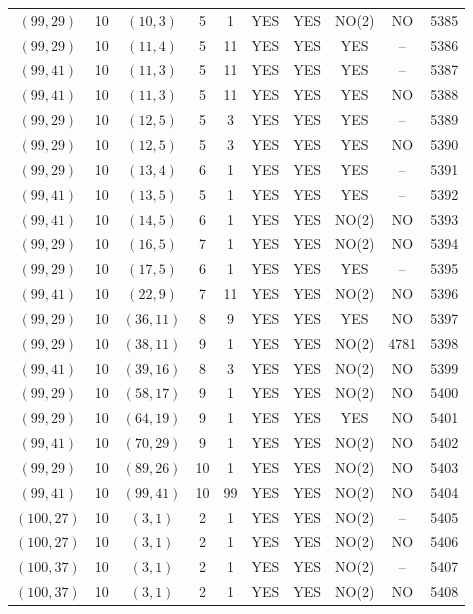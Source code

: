\begin{longtable}{|c|c|c|c|c|c|c|c|c|c|}
$(99, 29)$ & 10 & $(10, 3)$ & 5 & 1 & YES & YES & NO(2) & NO & 5385\\
$(99, 29)$ & 10 & $(11, 4)$ & 5 & 11 & YES & YES & YES & -- & 5386\\
$(99, 41)$ & 10 & $(11, 3)$ & 5 & 11 & YES & YES & YES & -- & 5387\\
$(99, 41)$ & 10 & $(11, 3)$ & 5 & 11 & YES & YES & YES & NO & 5388\\
$(99, 29)$ & 10 & $(12, 5)$ & 5 & 3 & YES & YES & YES & -- & 5389\\
$(99, 29)$ & 10 & $(12, 5)$ & 5 & 3 & YES & YES & YES & NO & 5390\\
$(99, 29)$ & 10 & $(13, 4)$ & 6 & 1 & YES & YES & YES & -- & 5391\\
$(99, 41)$ & 10 & $(13, 5)$ & 5 & 1 & YES & YES & YES & -- & 5392\\
$(99, 41)$ & 10 & $(14, 5)$ & 6 & 1 & YES & YES & NO(2) & NO & 5393\\
$(99, 29)$ & 10 & $(16, 5)$ & 7 & 1 & YES & YES & NO(2) & NO & 5394\\
$(99, 29)$ & 10 & $(17, 5)$ & 6 & 1 & YES & YES & YES & -- & 5395\\
$(99, 41)$ & 10 & $(22, 9)$ & 7 & 11 & YES & YES & NO(2) & NO & 5396\\
$(99, 29)$ & 10 & $(36, 11)$ & 8 & 9 & YES & YES & YES & NO & 5397\\
$(99, 29)$ & 10 & $(38, 11)$ & 9 & 1 & YES & YES & NO(2) & 4781 & 5398\\
$(99, 41)$ & 10 & $(39, 16)$ & 8 & 3 & YES & YES & NO(2) & NO & 5399\\
$(99, 29)$ & 10 & $(58, 17)$ & 9 & 1 & YES & YES & NO(2) & NO & 5400\\
$(99, 29)$ & 10 & $(64, 19)$ & 9 & 1 & YES & YES & YES & NO & 5401\\
$(99, 41)$ & 10 & $(70, 29)$ & 9 & 1 & YES & YES & NO(2) & NO & 5402\\
$(99, 29)$ & 10 & $(89, 26)$ & 10 & 1 & YES & YES & NO(2) & NO & 5403\\
$(99, 41)$ & 10 & $(99, 41)$ & 10 & 99 & YES & YES & NO(2) & NO & 5404\\
$(100, 27)$ & 10 & $(3, 1)$ & 2 & 1 & YES & YES & NO(2) & -- & 5405\\
$(100, 27)$ & 10 & $(3, 1)$ & 2 & 1 & YES & YES & NO(2) & NO & 5406\\
$(100, 37)$ & 10 & $(3, 1)$ & 2 & 1 & YES & YES & NO(2) & -- & 5407\\
$(100, 37)$ & 10 & $(3, 1)$ & 2 & 1 & YES & YES & NO(2) & NO & 5408\\

\end{longtable}
